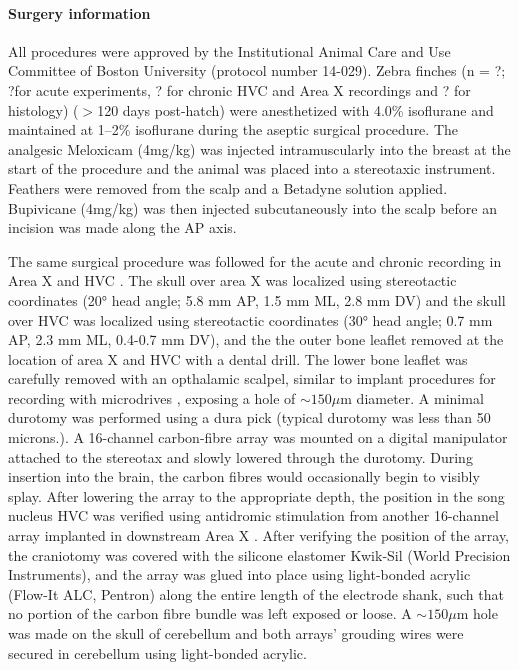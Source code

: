 \documentclass[10pt,letterpaper]{article}
\renewcommand{\subsubsection}[1]{\paragraph{#1}}
\begin{document}
\subsubsection{Surgery information}

All procedures were approved by the Institutional Animal Care and Use Committee of Boston University (protocol number 14-029). Zebra finches (n = ?; ?for acute experiments, ? for chronic HVC and Area X recordings and ? for histology) ($>$120 days post-hatch) were anesthetized with 4.0\% isoflurane and maintained at 1--2\% isoflurane during the aseptic surgical procedure. The analgesic Meloxicam (4mg/kg) was injected intramuscularly into the breast at the start of the procedure and the animal was placed into a stereotaxic instrument. Feathers were removed from the scalp and a Betadyne solution applied. Bupivicane (4mg/kg) was then injected subcutaneously into the scalp before an incision was made along the AP axis.

The same surgical procedure was followed for the acute and chronic
recording in Area X and HVC \cite{Guitchounts2013electrode}. The skull
over area X was localized using stereotactic coordinates (20° head
angle; 5.8 mm AP, 1.5 mm ML, 2.8 mm DV) and the skull over HVC was
localized using stereotactic coordinates (30° head angle; 0.7 mm AP,
2.3 mm ML, 0.4-0.7 mm DV), and the the outer bone leaflet removed at
the location of area X and HVC with a dental drill. The lower bone
leaflet was carefully removed with an opthalamic scalpel, similar to
implant procedures for recording with microdrives
\cite{Long2010synfire}, exposing a hole of $\sim 150 \mu$m diameter. A minimal
durotomy was performed using a dura pick (typical durotomy was less
than 50 microns.). A 16-channel carbon-fibre array
\cite{Guitchounts2013electrode} was mounted on a digital manipulator
attached to the stereotax and slowly lowered through the
durotomy. During insertion into the brain, the carbon fibres would
occasionally begin to visibly splay. After lowering the array to the
appropriate depth, the position in the song nucleus HVC was verified
using antidromic stimulation from another 16-channel array
implanted in downstream Area X
\cite{Hahnloser2002sparse,Guitchounts2013electrode}.  After verifying
the position of the array, the craniotomy was covered with the
silicone elastomer Kwik-Sil (World Precision Instruments), and the array was glued into place using
light-bonded acrylic (Flow-It ALC, Pentron) along the entire length of
the electrode shank, such that no portion of the carbon fibre bundle
was left exposed or loose. A $\sim 150\mu$m hole was made on the skull
of cerebellum and both arrays’ grouding wires were secured in
cerebellum using light-bonded acrylic.
\end{document}
